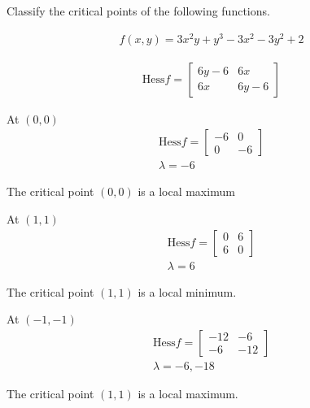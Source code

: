 Classify the critical points of the following functions.

\begin{align*}
    f(x, y) = 3x^2y + y^3 - 3x^2 - 3y^2 + 2
\end{align*}

\begin{solution}
\begin{align*}
    \mathrm{Hess} f = \begin{bmatrix}
        6y - 6 & 6x \\
        6x & 6y - 6
    \end{bmatrix}
\end{align*}

At $(0, 0)$
\begin{align*}
    \mathrm{Hess} f = \begin{bmatrix}
        -6 & 0 \\
        0 & -6
    \end{bmatrix} \\
    \lambda = -6
\end{align*}

The critical point $(0, 0)$ is a local maximum

At $(1, 1)$
\begin{align*}
    \mathrm{Hess} f = \begin{bmatrix}
        0 & 6 \\
        6 & 0
    \end{bmatrix} \\
    \lambda = 6
\end{align*}

The critical point $(1, 1)$ is a local minimum.

At $(-1, -1)$
\begin{align*}
    \mathrm{Hess} f = \begin{bmatrix}
        -12 & -6 \\
        -6 & -12
    \end{bmatrix} \\
    \lambda = -6, -18
\end{align*}

The critical point $(1, 1)$ is a local maximum.
\end{solution}
